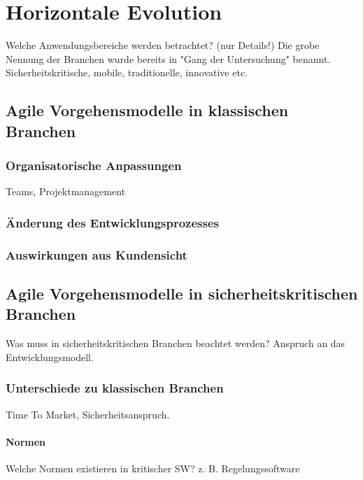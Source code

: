 \chapter{Horizontale Evolution} %

Welche Anwendungsbereiche werden betrachtet? (nur Details!)
Die grobe Nennung der Branchen wurde bereits in "Gang der Untersuchung" benannt.
Sicherheitskritische, mobile, traditionelle, innovative etc.

\section{Agile Vorgehensmodelle in klassischen Branchen}

\subsection{Organisatorische Anpassungen}

Teams, Projektmanagement

\subsection{Änderung des Entwicklungsprozesses}

\subsection{Auswirkungen aus Kundensicht}


\section{Agile Vorgehensmodelle in sicherheitskritischen Branchen}

Was muss in sicherheitskritischen Branchen beachtet werden?
Anspruch an das Entwicklungsmodell.

\subsection{Unterschiede zu klassischen Branchen}

Time To Market, Sicherheitsanspruch.

\subsubsection{Normen}

Welche Normen existieren in kritischer SW? z. B. Regelungssoftware

